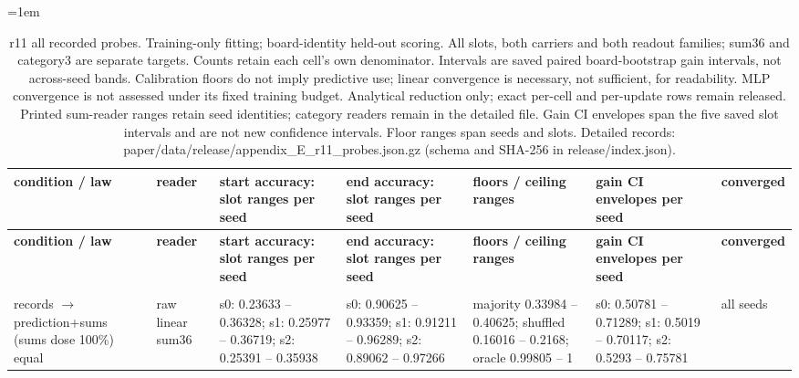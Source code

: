 \begingroup\fontsize{8}{9.5}\selectfont\setlength{\tabcolsep}{3pt}\emergencystretch=1em
\begin{longtable}{@{}>{\raggedright\arraybackslash}p{1.392in}>{\raggedright\arraybackslash}p{0.576in}>{\raggedright\arraybackslash}p{0.816in}>{\raggedright\arraybackslash}p{0.816in}>{\raggedright\arraybackslash}p{0.960in}>{\raggedright\arraybackslash}p{0.864in}>{\raggedright\arraybackslash}p{0.576in}@{}}
\caption{r11 all recorded probes. Training-only fitting; board-identity held-out scoring. All slots, both carriers and both readout families; sum36 and category3 are separate targets. Counts retain each cell's own denominator. Intervals are saved paired board-bootstrap gain intervals, not across-seed bands. Calibration floors do not imply predictive use; linear convergence is necessary, not sufficient, for readability. MLP convergence is not assessed under its fixed training budget. Analytical reduction only; exact per-cell and per-update rows remain released. Printed sum-reader ranges retain seed identities; category readers remain in the detailed file. Gain CI envelopes span the five saved slot intervals and are not new confidence intervals. Floor ranges span seeds and slots. Detailed records: paper/\allowbreak{}data/\allowbreak{}release/\allowbreak{}appendix\_\allowbreak{}E\_\allowbreak{}r11\_\allowbreak{}probes.json.gz (schema and SHA-256 in release/\allowbreak{}index.json).}\label{tab:appendix_E_r11_probes}\\
\toprule
\textbf{condition /\allowbreak{} law} & \textbf{reader} & \textbf{start accuracy: slot ranges per seed} & \textbf{end accuracy: slot ranges per seed} & \textbf{floors /\allowbreak{} ceiling ranges} & \textbf{gain CI envelopes per seed} & \textbf{converged} \\
\midrule\endfirsthead
\toprule
\textbf{condition /\allowbreak{} law} & \textbf{reader} & \textbf{start accuracy: slot ranges per seed} & \textbf{end accuracy: slot ranges per seed} & \textbf{floors /\allowbreak{} ceiling ranges} & \textbf{gain CI envelopes per seed} & \textbf{converged} \\
\midrule\endhead
\midrule\multicolumn{7}{r}{Continued on next page}\\\endfoot
\bottomrule\endlastfoot
records $\to$ prediction+sums (sums dose 100\%) equal & raw linear sum36 & s0: 0.23633 -- 0.36328; s1: 0.25977 -- 0.36719; s2: 0.25391 -- 0.35938 & s0: 0.90625 -- 0.93359; s1: 0.91211 -- 0.96289; s2: 0.89062 -- 0.97266 & majority 0.33984 -- 0.40625; shuffled 0.16016 -- 0.2168; oracle 0.99805 -- 1 & s0: 0.50781 -- 0.71289; s1: 0.5019 -- 0.70117; s2: 0.5293 -- 0.75781 & all seeds \\

\end{longtable}
